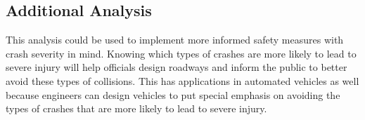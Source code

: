\documentclass[3p, authoryear]{elsarticle} %
\begin{document}
\hypertarget{additional-analysis}{%
\subsection{Additional Analysis}\label{additional-analysis}}

This analysis could be used to implement more informed safety measures with crash severity in mind. Knowing which types of crashes are more likely to lead to severe injury will help officials design roadways and inform the public to better avoid these types of collisions. This has applications in automated vehicles as well because engineers can design vehicles to put special emphasis on avoiding the types of crashes that are more likely to lead to severe injury.


\end{document}
